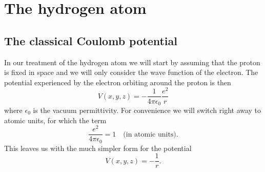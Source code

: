 \documentclass[../Main/chem331-notes.tex]{subfiles}
\begin{document}
\setcounter{section}{12}

\section{The hydrogen atom}
\subsection{The classical Coulomb potential}
In our treatment of the hydrogen atom we will start by assuming that the proton is fixed in space and we will only consider the wave function of the electron. The potential experienced by the electron orbiting around the proton is then
\begin{equation}
V(x,y,z) = - \frac{1}{4 \pi \epsilon_0} \frac{e^2}{r}
\end{equation}
where $\epsilon_0$ is the vacuum permittivity.
For convenience we will switch right away to atomic units, for which the term
\begin{equation}
\frac{e^2}{4 \pi \epsilon_0} = 1 \quad \text{(in atomic units)}.
\end{equation}
This leaves us with the much simpler form for the potential
\begin{equation}
V(x,y,z) = - \frac{1}{r}.
\end{equation}
\end{document}
